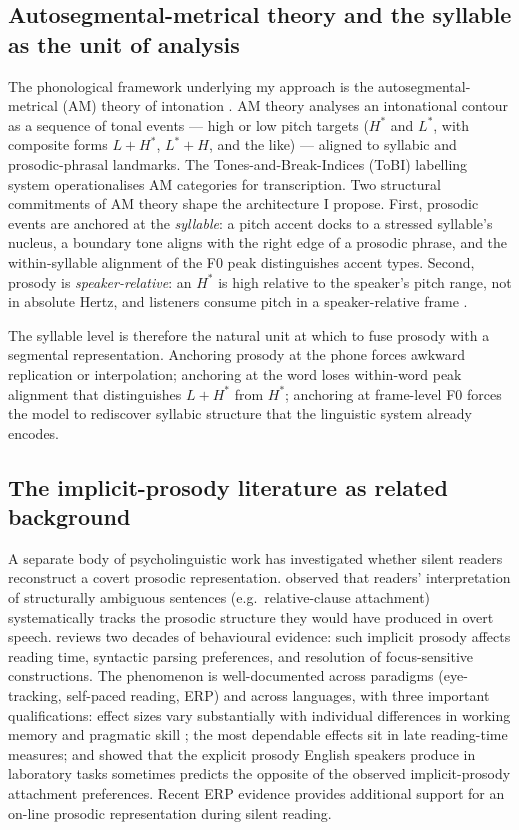 \documentclass[11pt,letterpaper]{article}
\begin{document}
\subsection{Autosegmental-metrical theory and the syllable as the unit of analysis}

The phonological framework underlying my approach is the autosegmental-metrical (AM) theory of intonation \citep{pierrehumbert1980, beckman1986, pierrehumbert1990}. AM theory analyses an intonational contour as a sequence of tonal events --- high or low pitch targets ($H^*$ and $L^*$, with composite forms $L+H^*$, $L^*+H$, and the like) --- aligned to syllabic and prosodic-phrasal landmarks. The Tones-and-Break-Indices (ToBI) labelling system \citep{silverman1992, beckman1997} operationalises AM categories for transcription. Two structural commitments of AM theory shape the architecture I propose. First, prosodic events are anchored at the \emph{syllable}: a pitch accent docks to a stressed syllable's nucleus, a boundary tone aligns with the right edge of a prosodic phrase, and the within-syllable alignment of the F0 peak distinguishes accent types. Second, prosody is \emph{speaker-relative}: an $H^*$ is high relative to the speaker's pitch range, not in absolute Hertz, and listeners consume pitch in a speaker-relative frame \citep{honorof2005}.

The syllable level is therefore the natural unit at which to fuse prosody with a segmental representation. Anchoring prosody at the phone forces awkward replication or interpolation; anchoring at the word loses within-word peak alignment that distinguishes $L+H^*$ from $H^*$; anchoring at frame-level F0 forces the model to rediscover syllabic structure that the linguistic system already encodes.

\subsection{The implicit-prosody literature as related background}

A separate body of psycholinguistic work has investigated whether silent readers reconstruct a covert prosodic representation. \citet{fodor2002} observed that readers' interpretation of structurally ambiguous sentences (e.g.\ relative-clause attachment) systematically tracks the prosodic structure they would have produced in overt speech. \citet{breen2014review} reviews two decades of behavioural evidence: such implicit prosody affects reading time, syntactic parsing preferences, and resolution of focus-sensitive constructions. The phenomenon is well-documented across paradigms (eye-tracking, self-paced reading, ERP) and across languages, with three important qualifications: effect sizes vary substantially with individual differences in working memory and pragmatic skill \citep{bishop2021, jun2010}; the most dependable effects sit in late reading-time measures; and \citet{jun2010} showed that the explicit prosody English speakers produce in laboratory tasks sometimes predicts the opposite of the observed implicit-prosody attachment preferences. Recent ERP evidence \citep{glushko2022} provides additional support for an on-line prosodic representation during silent reading.
\end{document}
